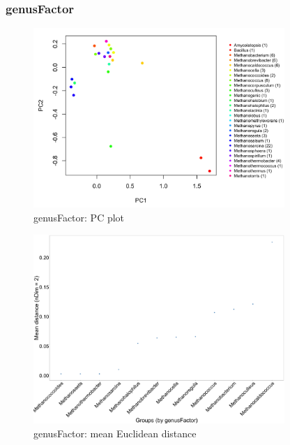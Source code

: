 \documentclass{article}
\begin{document}
\subsubsection*{genusFactor}
\begin{figure}\centering
\includegraphics[width=0.85\textwidth]{PCA/plot_scatter_genusFactor.png}
\caption{genusFactor:  PC plot}\label{fig:PCA/plot_scatter_genusFactor.png}\end{figure}
\begin{figure}\centering
\includegraphics[width=0.85\textwidth]{PCA/plot_mean_dist_genusFactor.png}
\caption{genusFactor:  mean Euclidean distance}\label{fig:PCA/plot_mean_dist_genusFactor.png}\end{figure}
\end{document}
